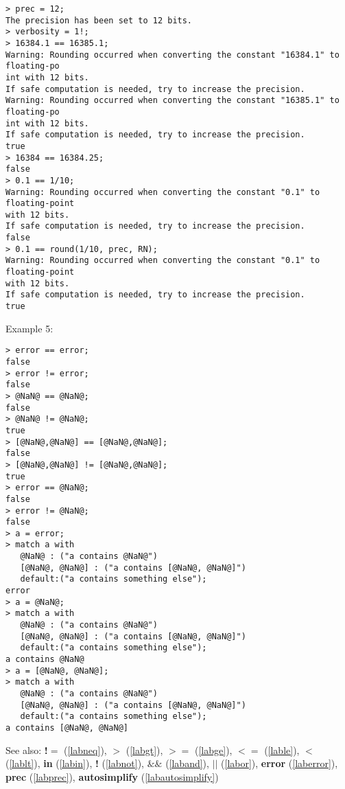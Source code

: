 \begin{center}\begin{minipage}{15cm}\begin{Verbatim}[frame=single]
> prec = 12;
The precision has been set to 12 bits.
> verbosity = 1!;
> 16384.1 == 16385.1;
Warning: Rounding occurred when converting the constant "16384.1" to floating-po
int with 12 bits.
If safe computation is needed, try to increase the precision.
Warning: Rounding occurred when converting the constant "16385.1" to floating-po
int with 12 bits.
If safe computation is needed, try to increase the precision.
true
> 16384 == 16384.25;
false
> 0.1 == 1/10;
Warning: Rounding occurred when converting the constant "0.1" to floating-point 
with 12 bits.
If safe computation is needed, try to increase the precision.
false
> 0.1 == round(1/10, prec, RN);
Warning: Rounding occurred when converting the constant "0.1" to floating-point 
with 12 bits.
If safe computation is needed, try to increase the precision.
true
\end{Verbatim}
\end{minipage}\end{center}
\noindent Example 5: 
\begin{center}\begin{minipage}{15cm}\begin{Verbatim}[frame=single]
> error == error;
false
> error != error;
false
> @NaN@ == @NaN@;
false
> @NaN@ != @NaN@;
true
> [@NaN@,@NaN@] == [@NaN@,@NaN@];
false
> [@NaN@,@NaN@] != [@NaN@,@NaN@];
true
> error == @NaN@;
false
> error != @NaN@;
false
> a = error;
> match a with
   @NaN@ : ("a contains @NaN@")
   [@NaN@, @NaN@] : ("a contains [@NaN@, @NaN@]")
   default:("a contains something else");
error
> a = @NaN@;
> match a with
   @NaN@ : ("a contains @NaN@")
   [@NaN@, @NaN@] : ("a contains [@NaN@, @NaN@]")
   default:("a contains something else");
a contains @NaN@
> a = [@NaN@, @NaN@];
> match a with
   @NaN@ : ("a contains @NaN@")
   [@NaN@, @NaN@] : ("a contains [@NaN@, @NaN@]")
   default:("a contains something else");
a contains [@NaN@, @NaN@]
\end{Verbatim}
\end{minipage}\end{center}
See also: \textbf{!$=$} (\ref{labneq}), \textbf{$>$} (\ref{labgt}), \textbf{$>=$} (\ref{labge}), \textbf{$<=$} (\ref{lable}), \textbf{$<$} (\ref{lablt}), \textbf{in} (\ref{labin}), \textbf{!} (\ref{labnot}), \textbf{$\&\&$} (\ref{laband}), \textbf{$||$} (\ref{labor}), \textbf{error} (\ref{laberror}), \textbf{prec} (\ref{labprec}), \textbf{autosimplify} (\ref{labautosimplify})
